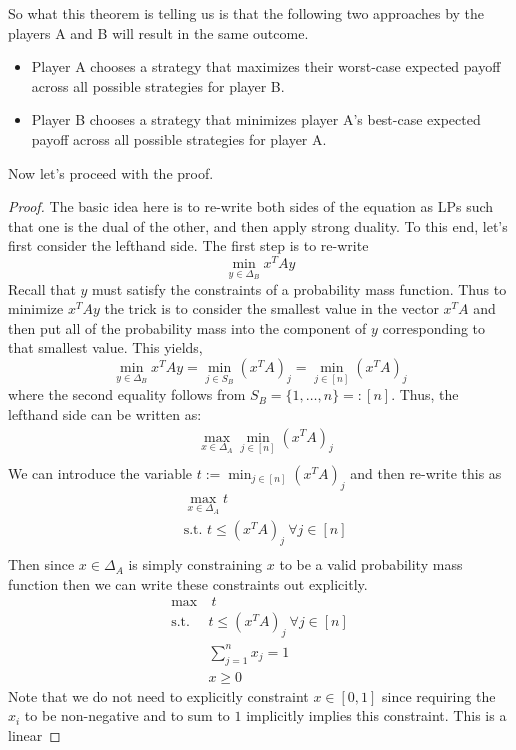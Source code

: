 \documentclass[12pt]{article}
\begin{document}
So what this theorem is telling us is that the following two approaches by the players A and B will result in the same outcome. 
\begin{itemize}
\item Player A chooses a strategy that maximizes their worst-case expected payoff across all possible strategies for player B. 
\item Player B chooses a strategy that minimizes player A's best-case expected payoff across all possible strategies for player A. 
\end{itemize}

Now let's proceed with the proof. 
\begin{proof}
The basic idea here is to re-write both sides of the equation as LPs such that one is the dual of the other, and then apply strong duality. To this end, let's first consider the lefthand side. The first 
step is to re-write
\[\min_{y \in \Delta_B} x^T A y\]
Recall that $y$ must satisfy the constraints of a probability mass function. Thus to minimize $x^T A y$ the trick is to consider the smallest value in the vector $x^T A$ and then put all of the probability
mass into the component of $y$ corresponding to that smallest value. This yields, 
\[\min_{y \in \Delta_B} x^T A y = \min_{j \in S_B} (x^T A)_j = \min_{j \in [n]} (x^T A)_j\]
where the second equality follows from $S_B = \{1, \dots, n\} =: [n]$. Thus, the lefthand side can be written as: 
\begin{align*}
&\max_{x \in \Delta_A}  \min_{j \in [n]} (x^T A)_j \\
\end{align*}
We can introduce the variable $t := \min_{j \in [n]} (x^T A)_j$ and then re-write this as
\begin{align*}
&\max_{x \in \Delta_A}  t \\
&\text{s.t. } t \leq (x^T A)_j \ \forall j \in [n]  \\
\end{align*}
Then since $x \in \Delta_A$ is simply constraining $x$ to be a valid probability mass function then we can write these constraints out explicitly. 
\begin{align*}
\max & \ t \\
\text{s.t. } &t \leq (x^T A)_j \ \forall j \in [n]  \\
&\sum_{j = 1}^{n} x_j = 1 \\
&x \geq 0
\end{align*}
Note that we do not need to explicitly constraint $x \in [0, 1]$ since requiring the $x_i$ to be non-negative and to sum to $1$ implicitly implies this constraint. This is a linear 

\end{proof}
\end{document}
